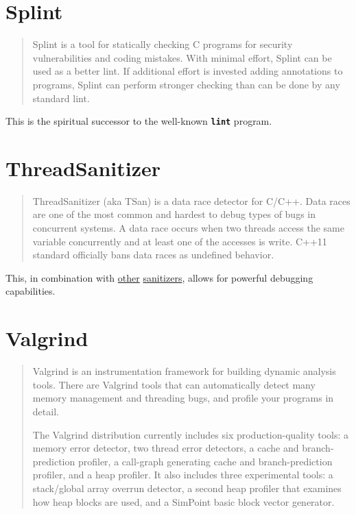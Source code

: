 \documentclass[12pt]{article}
\let\mytexttt\texttt%
\renewcommand{\texttt}[1]{\textbf{\mytexttt{#1}}%
}
\begin{document}
\cite{cpptest}
\section{Splint}

\begin{quote}
Splint is a tool for statically checking C programs for security
vulnerabilities and coding mistakes. With minimal effort, Splint can
be used as a better lint. If additional effort is invested adding
annotations to programs, Splint can perform stronger checking than
can be done by any standard lint.
\end{quote}

This is the spiritual successor to the well-known \texttt{lint} program.

\cite{splint}
\section{ThreadSanitizer}

\begin{quote}
ThreadSanitizer (aka TSan) is a data race detector for C/C++. Data
races are one of the most common and hardest to debug types of bugs
in concurrent systems. A data race occurs when two threads access
the same variable concurrently and at least one of the accesses
is write. C++11 standard officially bans data races as undefined
behavior.
\end{quote}

\label{tsan}
This, in combination with \hyperref[asan]{other} \hyperref[msan]{sanitizers},
allows for powerful debugging capabilities.

\cite{tsan}
\section{Valgrind}

\begin{quote}
Valgrind is an instrumentation framework for building dynamic analysis
tools. There are Valgrind tools that can automatically detect many
memory management and threading bugs, and profile your programs in
detail.

The Valgrind distribution currently includes six production-quality
tools: a memory error detector, two thread error detectors,
a cache and branch-prediction profiler, a call-graph generating
cache and branch-prediction profiler, and a heap profiler. It also
includes three experimental tools: a stack/global array overrun
detector, a second heap profiler that examines how heap blocks are
used, and a SimPoint basic block vector generator.
\end{quote}
\end{document}
